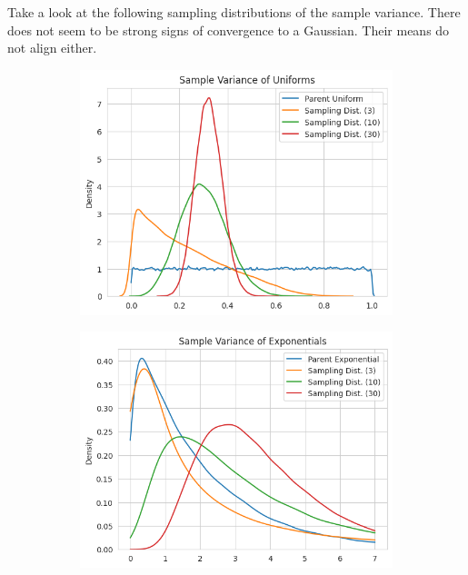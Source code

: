   \begin{example}
    Take a look at the following sampling distributions of the sample variance. There does not seem to be strong signs of convergence to a Gaussian. Their means do not align either. 
    \begin{figure}[H]
      \centering
      \begin{subfigure}[b]{0.48\textwidth}
      \centering
        \includegraphics[width=\textwidth]{img/sample_variance_uniform.png}
        \caption{}
        \label{fig:sample_variance_uniform}
      \end{subfigure}
      \hfill 
      \begin{subfigure}[b]{0.48\textwidth}
      \centering
        \includegraphics[width=\textwidth]{img/sample_variance_exp.png}
        \caption{}
        \label{fig:sample_variance_exp}
      \end{subfigure}
      \caption{}
      \label{fig:sample_variance_examples}
    \end{figure}
  \end{example}

